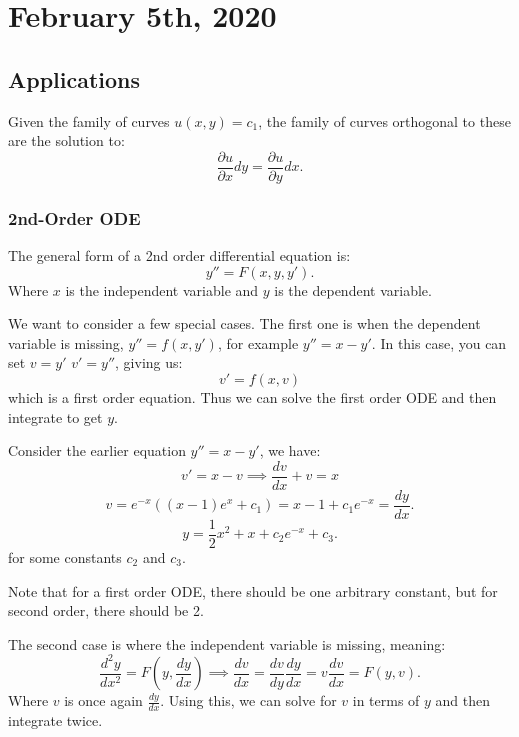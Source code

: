 \documentclass[../main/main.tex]{subfiles}
\begin{document}
\section{February  5th, 2020}
\subsection{Applications}
Given the family of curves $u(x,y) = c_1$, the family of curves orthogonal to these are the solution to: \[
\frac{\partial u}{\partial x} dy = \frac{\partial u}{\partial y} dx
.\] 
\subsubsection{2nd-Order ODE}
\begin{definition}
	The general form of a 2nd order differential equation is: \[
		y'' = F(x,y,y')
	.\] Where $x$ is the independent variable and  $y$ is the dependent variable.
\end{definition}
We want to consider a few special cases. The first one is when the dependent variable is missing, $y''=f(x,y')$, for example  $y''=x-y'$. In this case, you can set  $v=y'$ $v'=y''$, giving us: \[
	v'=f(x,v)
\]  which is a first order equation. Thus we can solve the first order ODE and then integrate to get $y$.
\begin{example}
	Consider the earlier equation $y''=x-y'$, we have: \[
	v' = x-v \implies \frac{dv}{dx}+v = x
	\] \[
	v = e^{-x}((x-1)e^{x}+c_1) = x-1+c_1e^{-x} = \frac{dy}{dx}
	.\] \[
	y = \frac{1}{2}x^2+x+c_2e^{-x}+c_3
	.\] for some constants $c_2$ and $c_3$.
\end{example}
\begin{remark}
	Note that for a first order ODE, there should be one arbitrary constant, but for second order, there should be 2.
\end{remark}
The second case is where the independent variable is missing, meaning: \[
	\frac{d^2y}{dx^2} = F(y,\frac{dy}{dx}) \implies \frac{dv}{dx} = \frac{dv}{dy} \frac{dy}{dx} =  v \frac{dv}{dx} = F(y,v)
.\] Where $v$ is once again $\frac{dy}{dx}$. Using this, we can solve for $v$ in terms of $y$ and then integrate twice.
\end{document}
